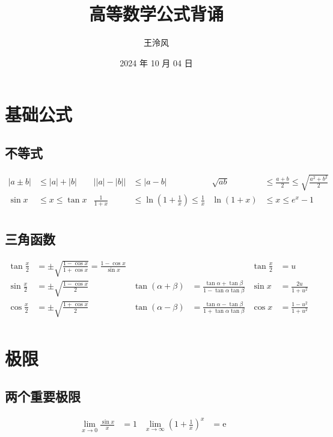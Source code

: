 ﻿\documentclass[a4paper,12pt,UTF8]{ctexart}
\begin{document}
    \title{高等数学公式背诵}
    \author{王泠风}
    \date{2024 年 10 月 04 日}
    \maketitle

    \section{基础公式}
    
    \subsection{不等式}
    \begin{align*}
        \left| a\pm b \right|& \leq \left| a \right| + \left| b \right|& \left| \left| a \right| - \left| b \right| \right|& \leq \left| a-b \right|& \sqrt{ab}& \leq \frac{a+b}{2} \leq \sqrt{\frac{a^2+b^2}{2}}&\\
        \sin x& \leq x \leq \tan x& \frac{1}{1+x}& \leq \ln \left( 1+\frac{1}{x} \right) \leq \frac{1}{x}& \ln \left( 1+x \right)& \leq x \leq e^x-1&\\
    \end{align*}

    \subsection{三角函数}
    \begin{align*}
        \tan \frac{x}{2}& = \pm \sqrt{\frac{1-\cos x}{1+\cos x}} = \frac{1-\cos x}{\sin x}& && \tan \frac{x}{2}& = u&\\
        \sin \frac{x}{2}& = \pm \sqrt{\frac{1-\cos x}{2}}& \tan (\alpha + \beta)& = \frac{\tan \alpha + \tan \beta}{1 - \tan \alpha \tan \beta}& \sin x& = \frac{2u}{1+u^{2}}&\\
        \cos \frac{x}{2}& = \pm \sqrt{\frac{1+\cos x}{2}}& \tan (\alpha - \beta)& = \frac{\tan \alpha - \tan \beta}{1 + \tan \alpha \tan \beta}& \cos x& = \frac{1-u^{2}}{1+u^{2}}&\\
    \end{align*}

    \section{极限}

    \subsection{两个重要极限}
    \begin{align*}
        \lim_{x\to 0}\frac{\sin x}{x}& = 1& \lim_{x\to\infty}\left(1+\frac{1}{x}\right)^x& = \mathrm{e}&\\
    \end{align*}
    
\end{document}
